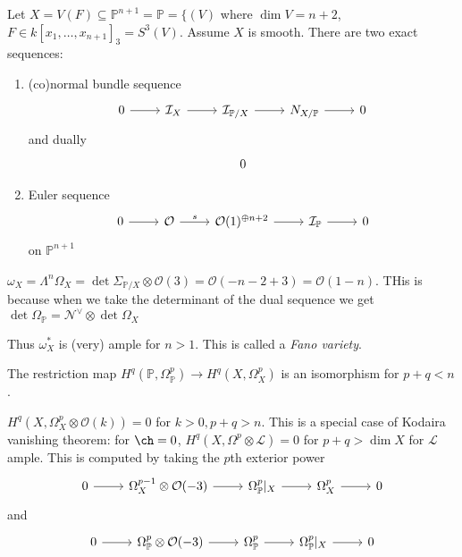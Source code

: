 \documentclass[a4paper]{article}
\renewcommand*{\P}{\mathbb{P}}
\newcommand{\sh}[1]{\mathcal{#1}} %
\begin{document}
Let \(X = V(F) \subseteq \P^{n + 1} = \P = \{(V)\) where \(\dim V = n + 2\), \(F \in k[x_1, \dots, x_{n + 1}]_3 = S^3(V)\). Assume \(X\) is smooth. There are two exact sequences:
\begin{enumerate}
\item (co)normal bundle sequence
  \[
    \begin{tikzcd}
      0 \ar[r] & \sh I_X \ar[r] & \sh I_{\P/X} \ar[r] & N_{X/\P} \ar[r] & 0
    \end{tikzcd}
  \]
  and dually
  \[
    \begin{tikzcd}
      0 
    \end{tikzcd}
  \]
\item Euler sequence
  \[
    \begin{tikzcd}
      0 \ar[r] & \sh O \ar[r, "s"] & \sh O(1)^{\oplus n + 2} \ar[r] & \sh I_\P \ar[r] & 0
    \end{tikzcd}
  \]
  on \(\P^{n + 1}\)
\end{enumerate}

\begin{corollary}
  \(\omega_X = \Lambda^n \Omega_X = \det \Sigma_{\P/X} \otimes \sh O(3) = \sh O(-n - 2 + 3) = \sh O(1 - n)\). THis is because when we take the determinant of the dual sequence we get \(\det \Omega_\P = \sh N^\vee \otimes \det \Omega_X\)

  Thus \(\omega_X^*\) is (very) ample for \(n > 1\). This is called a \emph{Fano variety}.
\end{corollary}

\begin{corollary}
  The restriction map \(H^q(\P, \Omega_\P^p) \to H^q(X, \Omega_X^p)\) is an isomorphism for \(p + q < n\).

  \(H^q(X, \Omega_X^p \otimes \sh O(k)) = 0\) for \(k > 0, p + q > n\). This is a special case of Kodaira vanishing theorem: for \(\ch = 0\), \(H^q(X, \Omega^p \otimes \sh L) = 0\) for \(p + q > \dim X\) for \(\sh L\) ample. This is computed by taking the \(p\)th exterior power
  \[
    \begin{tikzcd}
      0 \ar[r] & \Omega_X^{p - 1} \otimes \sh O(-3) \ar[r] & \Omega_\P^p|_X \ar[r] & \Omega_X^p \ar[r] & 0
    \end{tikzcd}
  \]
  and
  \[
    \begin{tikzcd}
      0 \ar[r] & \Omega_\P^p \otimes \sh O(-3) \ar[r] & \Omega_\P^p \ar[r] & \Omega_\P^p|_X \ar[r] & 0
    \end{tikzcd}
  \]
\end{corollary}
\end{document}
